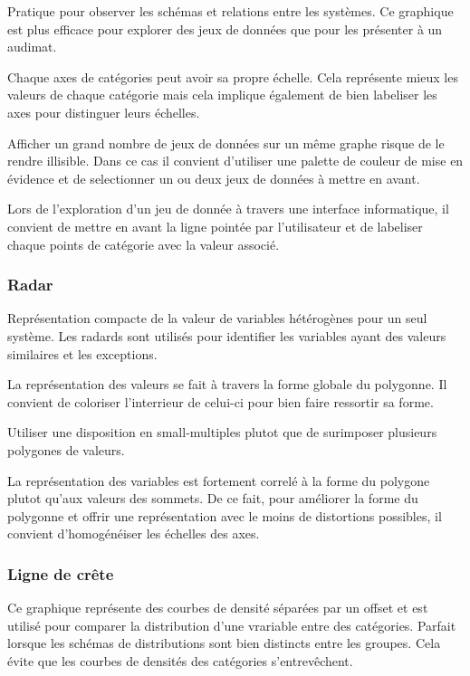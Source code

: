 \documentclass[a4paper,12pt]{article}
\begin{document}
\begin{multicols}{2}
Pratique pour observer les schémas et relations entre les systèmes. \autocite{mikeyiHowChooseRight2020} Ce graphique est plus efficace pour explorer des jeux de données que pour les présenter à un audimat. \autocite{sosulskiGraphics2019}

Chaque axes de catégories peut avoir sa propre échelle. Cela représente mieux les valeurs de chaque catégorie mais cela implique également de bien labeliser les axes pour distinguer leurs échelles. \autocite{jonathanschwabishRelationship2021}

Afficher un grand nombre de jeux de données sur un même graphe risque de le rendre illisible. \autocite{jonathanschwabishRelationship2021} Dans ce cas il convient d'utiliser une palette de couleur de mise en évidence et de selectionner un ou deux jeux de données à mettre en avant.

Lors de l'exploration d'un jeu de donnée à travers une interface informatique, il convient de mettre en avant la ligne pointée par l'utilisateur et de labeliser chaque points de catégorie avec la valeur associé. \autocite{sosulskiGraphics2019}
\subsubsection*{Radar}
\label{sec:org167a1d6}
Représentation compacte de la valeur de variables hétérogènes pour un seul système. \autocite{alansmithLexiqueVisuel} Les radards sont utilisés pour identifier les variables ayant des valeurs similaires et les exceptions. \autocite{sosulskiGraphics2019}

La représentation des valeurs se fait à travers la forme globale du polygonne. Il convient de coloriser l'interrieur de celui-ci pour bien faire ressortir sa forme. \autocite{jonathanschwabishRelationship2021}

Utiliser une disposition en small-multiples plutot que de surimposer plusieurs polygones de valeurs. \autocite{jonathanschwabishRelationship2021}

La représentation des variables est fortement correlé à la forme du polygone plutot qu'aux valeurs des sommets. \autocite{sosulskiGraphics2019} De ce fait, pour améliorer la forme du polygonne et offrir une représentation avec le moins de distortions possibles, il convient d'homogénéiser les échelles des axes.
\subsubsection*{Ligne de crête}
\label{sec:org3c7d167}
Ce graphique représente des courbes de densité séparées par un offset et est utilisé pour comparer la distribution d'une vrariable entre des catégories. \autocite{wilkeVisualizingManyDistributions2019} Parfait lorsque les schémas de distributions sont bien distincts entre les groupes. \autocite{mikeyiHowChooseRight2020} Cela évite que les courbes de densités des catégories s'entrevêchent.\autocite{jonathanschwabishDistribution2021}


\end{multicols}
\end{document}
